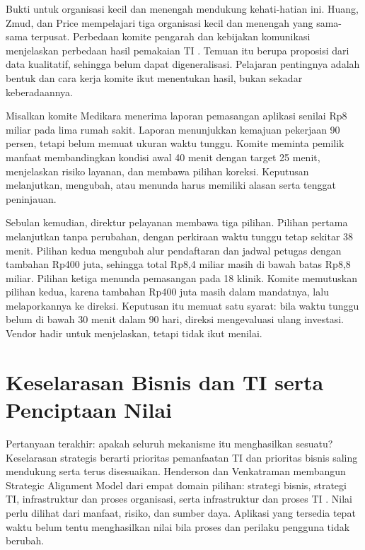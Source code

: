 Bukti untuk organisasi kecil dan menengah mendukung kehati-hatian ini. Huang, Zmud, dan Price
mempelajari tiga organisasi kecil dan menengah yang sama-sama terpusat. Perbedaan komite
pengarah dan kebijakan komunikasi menjelaskan perbedaan hasil pemakaian TI
\cite{c02-huang2010}. Temuan itu berupa proposisi dari data kualitatif, sehingga belum dapat
digeneralisasi. Pelajaran pentingnya adalah bentuk dan cara kerja komite ikut menentukan
hasil, bukan sekadar keberadaannya.

\begin{kasus}[title={Kasus Medikara Health: Komite yang Berani Meninjau Investasi}]
Misalkan komite Medikara menerima laporan pemasangan aplikasi senilai Rp8 miliar pada lima
rumah sakit. Laporan menunjukkan kemajuan pekerjaan 90 persen, tetapi belum memuat ukuran waktu
tunggu. Komite meminta pemilik manfaat membandingkan kondisi awal 40 menit dengan target 25
menit, menjelaskan risiko layanan, dan membawa pilihan koreksi. Keputusan melanjutkan, mengubah,
atau menunda harus memiliki alasan serta tenggat peninjauan.

Sebulan kemudian, direktur pelayanan membawa tiga pilihan. Pilihan pertama melanjutkan tanpa
perubahan, dengan perkiraan waktu tunggu tetap sekitar 38 menit. Pilihan kedua mengubah alur
pendaftaran dan jadwal petugas dengan tambahan Rp400 juta, sehingga total Rp8,4 miliar masih di
bawah batas Rp8,8 miliar. Pilihan ketiga menunda pemasangan pada 18 klinik. Komite memutuskan
pilihan kedua, karena tambahan Rp400 juta masih dalam mandatnya, lalu melaporkannya ke direksi.
Keputusan itu memuat satu syarat: bila waktu tunggu belum di bawah 30 menit dalam 90 hari,
direksi mengevaluasi ulang investasi. Vendor hadir untuk menjelaskan, tetapi tidak ikut menilai.
\end{kasus}

\section{Keselarasan Bisnis dan TI serta Penciptaan Nilai}

Pertanyaan terakhir: apakah seluruh mekanisme itu menghasilkan sesuatu? Keselarasan strategis
berarti prioritas pemanfaatan TI dan prioritas bisnis saling mendukung serta terus disesuaikan.
Henderson dan Venkatraman membangun Strategic Alignment Model dari empat domain pilihan:
strategi bisnis, strategi TI, infrastruktur dan proses organisasi, serta infrastruktur dan proses
TI \cite{c02-henderson1999}. Nilai perlu dilihat dari manfaat, risiko, dan sumber daya. Aplikasi
yang tersedia tepat waktu belum tentu menghasilkan nilai bila proses dan perilaku pengguna tidak
berubah.

